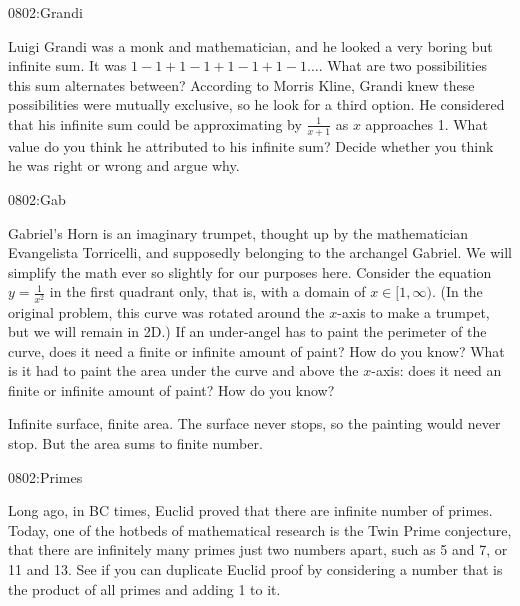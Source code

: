 \begin{defproblem}{0802:Grandi}
\begin{onlyproblem}
Luigi Grandi was a monk and mathematician, and he looked a very boring but infinite sum.
It was $1 - 1 + 1 - 1 + 1 - 1 + 1 -1 \dots$.  What are two possibilities this sum alternates 
between?  According to Morris Kline, Grandi knew these possibilities were mutually
exclusive, so he look for a third option.  He considered that his infinite sum could
be approximating by $\frac{1}{x+1}$ as $x$ approaches 1.  What value do you think
he attributed to his infinite sum?  Decide whether you think he was right or wrong
and argue why.
\end{onlyproblem}
\begin{onlysolution}

\end{onlysolution}
\end{defproblem}



\begin{defproblem}{0802:Gab}
\begin{onlyproblem}
Gabriel's Horn is an imaginary trumpet, thought up by the mathematician Evangelista 
Torricelli, and supposedly belonging to the archangel Gabriel.  
We will simplify the math ever so slightly for our purposes here.  Consider the
equation $y=\frac{1}{x^2}$ in the first quadrant only, that is, with a domain of $x\in{[1,\infty)}$.
(In the original problem, this curve was rotated around the $x$-axis to make a trumpet, but
we will remain in 2D.)  If an under-angel has to paint the perimeter of the curve, does it
need a finite or infinite amount of paint?  How do you know?  What is it had to paint
the area under the curve and above the $x$-axis: does it need an finite or infinite amount
of paint?  How do you know?

\end{onlyproblem}
\begin{onlysolution}
Infinite surface, finite area.  The surface never stops, so the painting would never stop.  But the
area sums to finite number.
\end{onlysolution}
\end{defproblem}





\begin{defproblem}{0802:Primes}
\begin{onlyproblem}
Long ago, in BC times, Euclid proved that there are infinite number of primes.  Today, one of
the hotbeds of mathematical research is the Twin Prime conjecture, that there are infinitely
many primes just two numbers apart, such as 5 and 7, or 11 and 13.  See if you can
duplicate Euclid proof by considering a number that is the product of all primes and adding 1
to it.
\end{onlyproblem}
\begin{onlysolution}

\end{onlysolution}
\end{defproblem}


